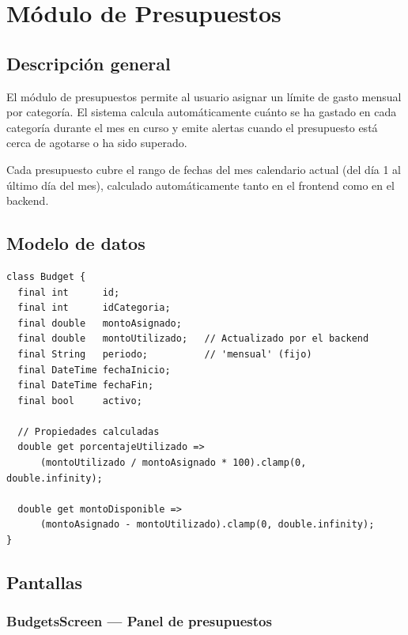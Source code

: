 \documentclass[12pt, letterpaper]{article}
\begin{document}
\section{Módulo de Presupuestos}

\subsection{Descripción general}

El módulo de presupuestos permite al usuario asignar un límite de gasto
mensual por categoría. El sistema calcula automáticamente cuánto se ha
gastado en cada categoría durante el mes en curso y emite alertas cuando
el presupuesto está cerca de agotarse o ha sido superado.

Cada presupuesto cubre el rango de fechas del mes calendario actual
(del día 1 al último día del mes), calculado automáticamente tanto en el
frontend como en el backend.

\subsection{Modelo de datos}

\begin{lstlisting}
class Budget {
  final int      id;
  final int      idCategoria;
  final double   montoAsignado;
  final double   montoUtilizado;   // Actualizado por el backend
  final String   periodo;          // 'mensual' (fijo)
  final DateTime fechaInicio;
  final DateTime fechaFin;
  final bool     activo;

  // Propiedades calculadas
  double get porcentajeUtilizado =>
      (montoUtilizado / montoAsignado * 100).clamp(0, double.infinity);

  double get montoDisponible =>
      (montoAsignado - montoUtilizado).clamp(0, double.infinity);
}
\end{lstlisting}

\subsection{Pantallas}

\subsubsection{BudgetsScreen — Panel de presupuestos}
\end{document}
